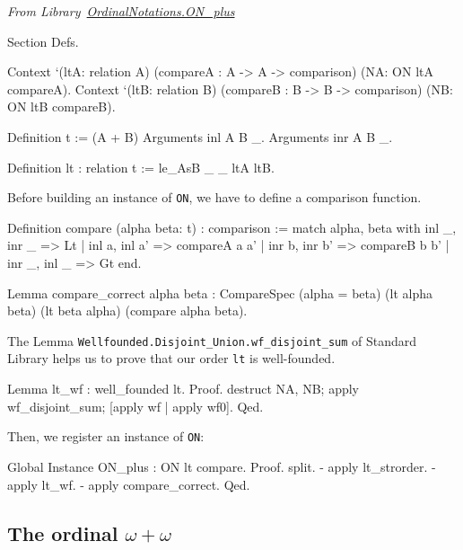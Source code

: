 \vspace{4pt}
\noindent\emph{From Library~\href{../theories/html/hydras.OrdinalNotations/ON_plus.html}{OrdinalNotations.ON\_plus}}


\begin{Coqsrc}
Section Defs.

  Context `(ltA: relation A)
          (compareA : A -> A -> comparison)
          (NA: ON ltA compareA).
  Context `(ltB: relation B)
          (compareB : B -> B -> comparison)
          (NB: ON ltB compareB).


Definition t := (A + B)%
Arguments inl  {A B} _.
Arguments inr  {A B} _.

Definition lt : relation t := le_AsB _ _ ltA ltB.
\end{Coqsrc}

Before building an instance of \texttt{ON}, we have to define a comparison function.


\begin{Coqsrc}
Definition compare (alpha beta: t) : comparison :=
   match alpha, beta with
     inl _, inr _ => Lt
   | inl a, inl a' => compareA a a'
   | inr b, inr b' => compareB b b'
   | inr _, inl _ => Gt
  end.

Lemma compare_correct alpha beta :
    CompareSpec (alpha = beta) (lt alpha beta) (lt beta alpha)
                            (compare alpha beta).
\end{Coqsrc}

The Lemma \texttt{Wellfounded.Disjoint\_Union.wf\_disjoint\_sum} of Standard Library
helps us to prove that our order \texttt{lt} is well-founded.

\begin{Coqsrc}
Lemma lt_wf : well_founded lt.
Proof. 
  destruct NA, NB; apply wf_disjoint_sum; [apply wf | apply wf0].
Qed.
\end{Coqsrc}

Then, we register an instance of \texttt{ON}:

\begin{Coqsrc}
Global Instance ON_plus : ON lt compare.
Proof.
  split.
  - apply lt_strorder.
  -  apply lt_wf.
  - apply compare_correct.
Qed.
\end{Coqsrc}






\subsection{The ordinal \texorpdfstring{$\omega+\omega$}{omega + omega}}

